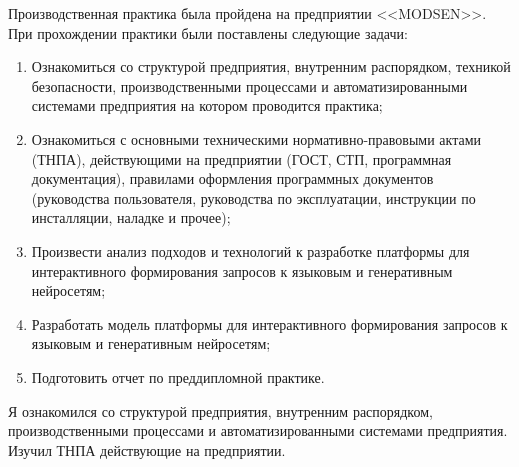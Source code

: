 \label{sec:practice:introduction}
Производственная практика была пройдена на предприятии <<MODSEN>>. При прохождении практики были поставлены следующие задачи:
\begin{enumerate}[label=\arabic*.]
    \item {Ознакомиться со структурой предприятия, внутренним распорядком, техникой безопасности, производственными процессами и автоматизированными системами предприятия на котором проводится практика;}
    \item{Ознакомиться с основными техническими нормативно-правовыми актами (ТНПА), действующими на предприятии (ГОСТ, СТП, программная документация), правилами  оформления программных документов (руководства пользователя, руководства по эксплуатации, инструкции по инсталляции, наладке и прочее);}
    \item{Произвести анализ подходов и технологий к разработке платформы для интерактивного формирования запросов к языковым и генеративным нейросетям;} 
    \item{Разработать модель платформы для интерактивного формирования запросов к языковым и генеративным нейросетям;} %
    \item{Подготовить отчет по преддипломной практике.}
\end{enumerate}
Я ознакомился со структурой предприятия, внутренним распорядком, производственными процессами и автоматизированными системами предприятия. Изучил ТНПА действующие на предприятии.